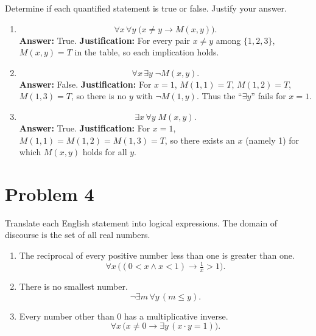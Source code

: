 \documentclass{amsart}
\theoremstyle{definition}
\theoremstyle{Exercise}
\theoremstyle{remark}
\theoremstyle{rule}
\numberwithin{equation}{section}
\begin{document}
Determine if each quantified statement is true or false. Justify your answer.

\begin{enumerate}[label=(\alph*)]

\item 
\[
  \forall x\,\forall y\;\bigl(x\neq y\to M(x,y)\bigr).
\]
\textbf{Answer:} True.  
\textbf{Justification:} For every pair $x\neq y$ among $\{1,2,3\}$, $M(x,y)=T$ in the table, so each implication holds.

\item 
\[
  \forall x\,\exists y\;\neg M(x,y).
\]
\textbf{Answer:} False.  
\textbf{Justification:} For $x=1$, $M(1,1)=T$, $M(1,2)=T$, $M(1,3)=T$, so there is no $y$ with $\neg M(1,y)$. Thus the “$\exists y$” fails for $x=1$.

\item 
\[
  \exists x\,\forall y\;M(x,y).
\]
\textbf{Answer:} True.  
\textbf{Justification:} For $x=1$, $M(1,1)=M(1,2)=M(1,3)=T$, so there exists an $x$ (namely 1) for which $M(x,y)$ holds for all $y$.

\end{enumerate}

\newpage

\section*{Problem 4}
Translate each English statement into logical expressions. The domain of discourse is the set of all real numbers.

\begin{enumerate}[label=(\alph*)]

\item The reciprocal of every positive number less than one is greater than one.\\
\[
  \forall x\,\bigl((0<x\land x<1)\to \tfrac1x>1\bigr).
\]

\item There is no smallest number.\\
\[
  \neg\exists m\,\forall y\,(m\le y).
\]

\item Every number other than 0 has a multiplicative inverse.\\
\[
  \forall x\,\bigl(x\neq 0\to \exists y\,(x\cdot y=1)\bigr).
\]

\end{enumerate}
\end{document}
